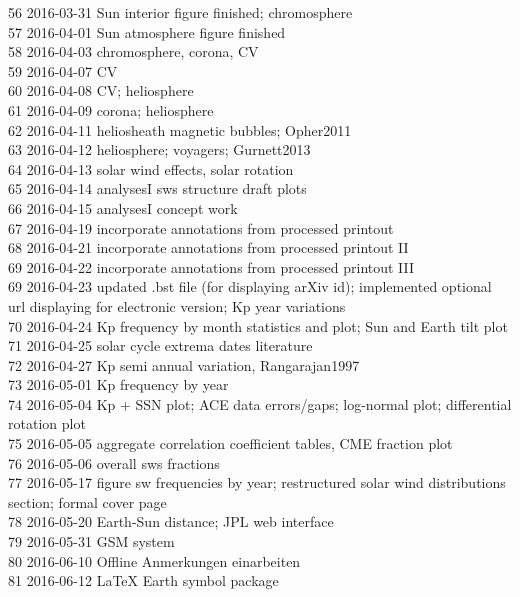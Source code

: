 \begin{footnotesize}
56	2016-03-31	Sun interior figure finished; chromosphere\\
57	2016-04-01	Sun atmosphere figure finished\\
58	2016-04-03	chromosphere, corona, CV\\
59	2016-04-07	CV\\
60	2016-04-08	CV; heliosphere\\
61	2016-04-09	corona; heliosphere\\
62	2016-04-11	heliosheath magnetic bubbles; Opher2011\\
63	2016-04-12	heliosphere; voyagers; Gurnett2013\\
64	2016-04-13	solar wind effects, solar rotation\\
65	2016-04-14	analysesI sws structure draft plots\\
66	2016-04-15	analysesI concept work\\
67	2016-04-19	incorporate annotations from processed printout\\
68	2016-04-21	incorporate annotations from processed printout II\\
69	2016-04-22	incorporate annotations from processed printout III\\
69	2016-04-23	updated .bst file (for displaying arXiv id); implemented optional url displaying for electronic version; Kp year variations\\
70	2016-04-24	Kp frequency by month statistics and plot; Sun and Earth tilt plot\\
71	2016-04-25	solar cycle extrema dates literature\\
72	2016-04-27	Kp semi annual variation, Rangarajan1997\\
73	2016-05-01	Kp frequency by year\\
74	2016-05-04	Kp + SSN plot; ACE data errors/gaps; log-normal plot; differential rotation plot\\
75	2016-05-05	aggregate correlation coefficient tables, CME fraction plot\\
76	2016-05-06	overall sws fractions\\
77	2016-05-17	figure sw frequencies by year; restructured solar wind distributions section; formal cover page\\
78	2016-05-20	Earth-Sun distance; JPL web interface\\
79	2016-05-31	GSM system\\
80	2016-06-10	Offline Anmerkungen einarbeiten\\
81	2016-06-12	LaTeX Earth symbol package\\

\end{footnotesize}
